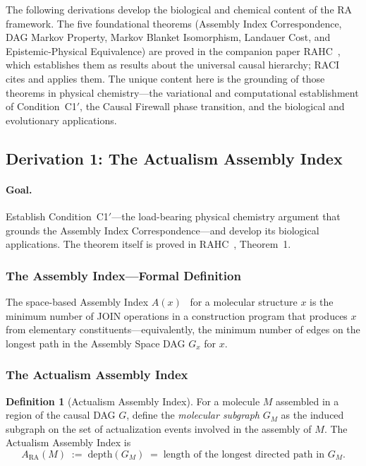 \documentclass[11pt,a4paper]{article}
\theoremstyle{plain}
\theoremstyle{definition}
\newtheorem{definition}[theorem]{Definition}
\theoremstyle{remark}
\newcommand{\ARA}{A_{\mathrm{RA}}}
\newcommand{\GM}{G_{M}}
\begin{document}
\label{sec:math}

The following derivations develop the biological and chemical content of the RA
framework. The five foundational theorems (Assembly Index Correspondence,
DAG Markov Property, Markov Blanket Isomorphism, Landauer Cost, and
Epistemic-Physical Equivalence) are proved in the companion paper
RAHC~\citep{Sandeman2026RAHC}, which establishes them as results about the
universal causal hierarchy; RACI cites and applies them. The unique content
here is the grounding of those theorems in physical chemistry---the variational
and computational establishment of Condition~C1$'$, the Causal Firewall phase
transition, and the biological and evolutionary applications.

\subsection{Derivation 1: The Actualism Assembly Index}
\label{sec:assembly}

\paragraph{Goal.} Establish Condition~C1$'$---the load-bearing physical chemistry
argument that grounds the Assembly Index Correspondence---and develop its
biological applications. The theorem itself is proved in
RAHC~\citep{Sandeman2026RAHC}, Theorem~1.

\subsubsection{The Assembly Index---Formal Definition}

The space-based Assembly Index $A(x)$~\citep{Murray2023} for a molecular structure
$x$ is the minimum number of JOIN operations in a construction program that
produces $x$ from elementary constituents---equivalently, the minimum number of
edges on the longest path in the Assembly Space DAG $G_{x}$ for $x$.

\subsubsection{The Actualism Assembly Index}

\begin{definition}[Actualism Assembly Index]
For a molecule $M$ assembled in a region of the causal DAG $G$, define the
\emph{molecular subgraph} $\GM$ as the induced subgraph on the set of
actualization events involved in the assembly of $M$. The Actualism Assembly Index
is
\begin{equation}
  \ARA(M) \;:=\; \mathrm{depth}(\GM)
  \;=\; \text{length of the longest directed path in } \GM.
\end{equation}
\end{definition}
\end{document}
